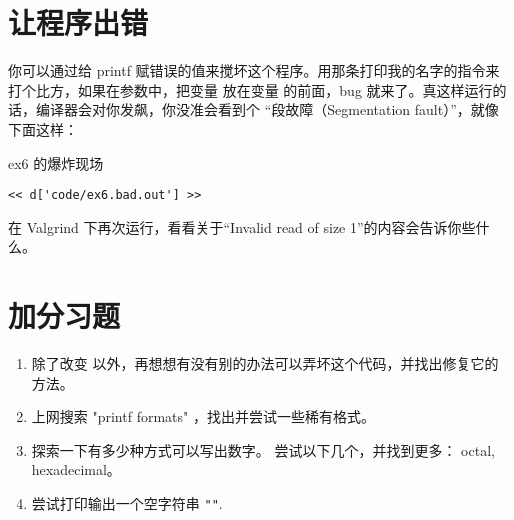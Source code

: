 \section{让程序出错}

你可以通过给 printf 赋错误的值来搅坏这个程序。用那条打印我的名字的指令来打个比方，如果在参数中，把变量  放在变量  的前面，bug 就来了。真这样运行的话，编译器会对你发飙，你没准会看到个
“段故障（Segmentation fault）”，就像下面这样：

\begin{code}{ex6 的爆炸现场}
\begin{lstlisting}
<< d['code/ex6.bad.out'] >>
\end{lstlisting}
\end{code}

在 Valgrind 下再次运行，看看关于“Invalid read of size 1”的内容会告诉你些什么。


\section{加分习题}

\begin{enumerate}
\item 除了改变  以外，再想想有没有别的办法可以弄坏这个代码，并找出修复它的方法。
\item 上网搜索 "printf formats" ，找出并尝试一些稀有格式。
\item 探索一下有多少种方式可以写出数字。 尝试以下几个，并找到更多： octal, hexadecimal。
\item 尝试打印输出一个空字符串 \verb|""|.
\end{enumerate}

